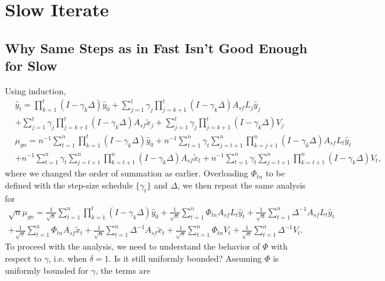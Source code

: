 \section{Slow Iterate}

\subsection{Why Same Steps as in Fast Isn't Good Enough for Slow}
Using induction,
\begin{align*}
    &\hat{y}_{t} 
    = \prod_{k=1}^t (I - \gamma_k \Delta) \hat{y}_0 
    + \sum_{j=1}^t \gamma_j \prod_{j=k+1}^t (I - \gamma_k \Delta) A_{sf} L_j \hat{y}_j 
    \\ 
    &+ \sum_{j=1}^t \gamma_j \prod_{j=k+1}^t (I - \gamma_k \Delta) A_{sf} \tilde{x}_j 
    + \sum_{j=1}^t \gamma_j \prod_{j=k+1}^t (I - \gamma_k \Delta)V_j 
    \\
    & \hat{\mu}_{yn} = n^{-1} \sum_{t=1}^n \prod_{k=1}^t (I - \gamma_k \Delta) \hat{y}_0 + n^{-1} \sum_{t=1}^n \gamma_t \sum_{j=t+1}^n \prod_{k=j+1}^n (I - \gamma_k \Delta) A_{sf} L_t \hat{y}_t 
\\ & + n^{-1} \sum_{t=1}^n \gamma_t \sum_{j=t+1}^n \prod_{k=t+1}^n (I - \gamma_k \Delta) A_{sf} \tilde{x}_t + n^{-1} \sum_{t=1}^n \gamma_t \sum_{j=t+1}^n \prod_{k=t+1}^n (I - \gamma_k \Delta) V_t
    ,
\end{align*}
where we changed the order of summation as earlier.
Overloading $\Phi_{tn}$ to be defined with the step-size schedule $\{\gamma_t\}$ and $\Delta$, we then repeat the same analysis for 
\begin{align*}
    \sqrt{n} \hat{\mu}_{yn} = \frac{1}{\sqrt{n}} \sum_{t=1}^n \prod_{k=1}^t (I - \gamma_k \Delta) \hat{y}_0 + \frac{1}{\sqrt{n}} \sum_{t=1}^n \Phi_{tn} A_{sf} L_t \hat{y}_t + \frac{1}{\sqrt{n}} \sum_{t=1}^n \Delta^{-1} A_{sf} L_t \hat{y}_t 
    \\
    + \frac{1}{\sqrt{n}} \sum_{t=1}^n \Phi_{tn} A_{sf} \tilde{x}_t + \frac{1}{\sqrt{n}} \sum_{t=1}^n \Delta^{-1} A_{sf} \tilde{x}_t + 
    \frac{1}{\sqrt{n}} \sum_{t=1}^n \Phi_{tn} V_t + \frac{1}{\sqrt{n}} \sum_{t=1}^n \Delta^{-1} V_t .
\end{align*}
{\color{red}To proceed with the analysis, we need to understand the behavior of $\Phi$ with respect to $\gamma$, i.e. when $\delta = 1$. Is it still uniformly bounded?}
{\color{red}Assuming $\Phi$ is uniformly bounded for $\gamma$, }
the terms are 
